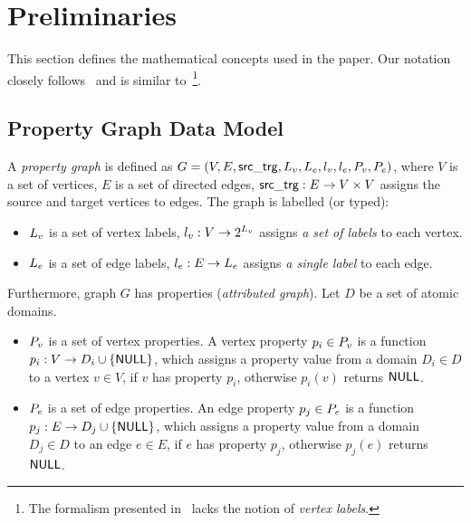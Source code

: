 \section{Preliminaries}
\label{sec:preliminaries}

This section defines the mathematical concepts used in the paper. Our notation closely follows~\cite{DBLP:conf/edbt/HolschG16} and is similar to~\cite{DBLP:books/igi/Sakr11/RodriguezN11}\footnote{The formalism presented in~\cite{DBLP:books/igi/Sakr11/RodriguezN11} lacks the notion of \emph{vertex labels}.}.

\subsection{Property Graph Data Model}

A \emph{property graph} is defined as $G = (V, E, \mathsf{src\_trg}, L_v, L_e, l_v, l_e, P_v, P_e)$, where $V$ is a set of vertices, $E$ is a set of directed edges, $\mathsf{src\_trg}: E \rightarrow V \times V$ assigns the source and target vertices to edges. The graph is labelled (or typed):
\begin{itemize}
	\item $L_v$ is a set of vertex labels, $l_v: V \rightarrow 2^{L_v}$ assigns \emph{a set of labels} to each vertex.
	\item $L_e$ is a set of edge labels, $l_e: E \rightarrow L_e$ assigns \emph{a single label} to each edge.
\end{itemize}

Furthermore, graph $G$ has properties (\emph{attributed graph}). Let $D$ be a set of atomic domains.
\begin{itemize}
	\item $P_v$ is a set of vertex properties. A vertex property $p_i \in P_v$ is a function $p_i: V \rightarrow D_i \cup \{ \mathsf{NULL} \}$, which assigns a property value from a domain $D_i \in D$ to a vertex $v \in V$, if $v$ has property $p_i$, otherwise $p_i(v)$ returns $\mathsf{NULL}$.
	\item $P_e$ is a set of edge properties. An edge property $p_j \in P_e$ is a function $p_j: E \rightarrow D_j \cup \{ \mathsf{NULL} \}$, which assigns a property value from a domain $D_j \in D$ to an edge $e \in E$, if $e$ has property $p_j$, otherwise $p_j(e)$ returns $\mathsf{NULL}$.
\end{itemize}

